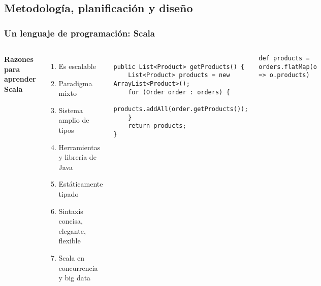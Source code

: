 \documentclass{beamer}
\begin{document}
\subsection{Metodología, planificación y diseño}
\begin{frame}[fragile]
\frametitle{Un lenguaje de programación: Scala}
\begin{columns}[c] %

\textbf{Razones para aprender Scala}
\begin{enumerate}
\item Es escalable
\item Paradigma mixto
\item Sistema amplio de tipos
\item Herramientas y librería de Java
\item Estáticamente tipado
\item Sintaxis concisa, elegante, flexible
\item Scala en concurrencia y big data
\end{enumerate}

\begin{example}
\begin{tiny}
\begin{verbatim}

public List<Product> getProducts() {
    List<Product> products = new ArrayList<Product>();
    for (Order order : orders) {
        products.addAll(order.getProducts());
    }
    return products;
}

\end{verbatim}\end{tiny}
\end{example}

\begin{example}
\begin{tiny}
\begin{verbatim}
def products = orders.flatMap(o => o.products)
\end{verbatim}\end{tiny}
\end{example}
\end{columns}
\end{frame}
\end{document}
